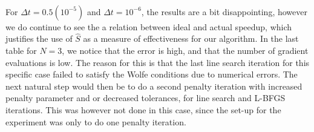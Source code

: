 \\
For $\Delta t = 0.5(10^{-5})$ and $\Delta t = 10^{-6}$, the results are a bit disappointing, however we do continue to see the a relation between ideal and actual speedup, which justifies the use of $\hat S$ as a measure of effectiveness for our algorithm. In the last table for $N=3$, we notice that the error is high, and that the number of gradient evaluations is low. The reason for this is that the last line search iteration for this specific case failed to satisfy the Wolfe conditions due to numerical errors. The next natural step would then be to do a second penalty iteration with increased penalty parameter and or decreased tolerances, for line search and L-BFGS iterations. This was however not done in this case, since the set-up for the experiment was only to do one penalty iteration.
